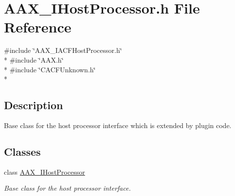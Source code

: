 \hypertarget{a00249}{}\section{A\+A\+X\+\_\+\+I\+Host\+Processor.\+h File Reference}
\label{a00249}
{\ttfamily \#include \char`\"{}A\+A\+X\+\_\+\+I\+A\+C\+F\+Host\+Processor.\+h\char`\"{}}\\*
{\ttfamily \#include \char`\"{}A\+A\+X.\+h\char`\"{}}\\*
{\ttfamily \#include \char`\"{}C\+A\+C\+F\+Unknown.\+h\char`\"{}}\\*


\subsection{Description}
Base class for the host processor interface which is extended by plugin code. 

\subsection*{Classes}
\begin{DoxyCompactItemize}
\item 
class \hyperlink{a00101}{A\+A\+X\+\_\+\+I\+Host\+Processor}
\begin{DoxyCompactList}\small\item\em Base class for the host processor interface. \end{DoxyCompactList}\end{DoxyCompactItemize}
